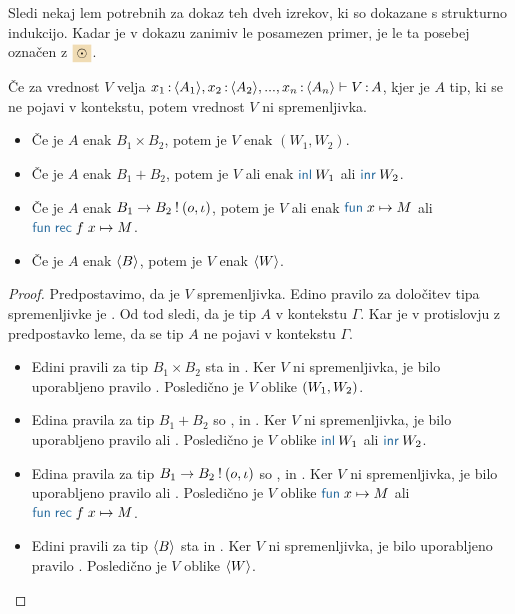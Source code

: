 Sledi nekaj lem potrebnih za dokaz teh dveh izrekov, ki so dokazane s strukturno indukcijo. Kadar je v dokazu zanimiv le posamezen primer, je le ta posebej označen z $\sitem$.


\begin{lema}\label{lem:ni-spremenljivka}
	Če za vrednost $V$ velja $x_1 \mathinner{:} \langle A_1 \rangle, x_2 \mathinner{:} \langle A_2 \rangle, ..., x_n \mathinner{:} \langle A_n \rangle \vdash V \mathinner{:} A$, kjer je $A$ tip, ki se ne pojavi v kontekstu, potem vrednost $V$ ni spremenljivka.
	\begin{itemize}
		\item Če je $A$ enak $B_1 \times B_2$, potem je $V$ enak $(W_1,W_2)$.
		\item Če je $A$ enak $B_1 + B_2$, potem je $V$ ali enak $\tminl{W_1}$ ali $\tminr{W_2}$.
		\item Če je $A$ enak $B_1 \to B_2 \mathbin{!} (o, \iota)$, potem je $V$ ali enak $\tmfunano{x}{M}$ ali $\tmfunrecano{f}{x}{M}$.
		\item Če je $A$ enak $\langle B \rangle$, potem je $V$ enak $\langle W \rangle$.
	\end{itemize}
\end{lema}

\begin{proof}
	Predpostavimo, da je $V$ spremenljivka. Edino pravilo za določitev tipa spremenljivke je .
	Od tod sledi, da je tip $A$ v kontekstu $\Gamma$. Kar je v protislovju z predpostavko leme, da se tip $A$ ne pojavi v kontekstu $\Gamma$.
	\begin{itemize}
		\item Edini pravili za tip $B_1 \times B_2$ sta  in .
		Ker $V$ ni spremenljivka, je bilo uporabljeno pravilo .
		Posledično je $V$ oblike $( W_1 , W_2 )$.
		
		\item Edina pravila za tip $B_1 + B_2$ so ,  in .
		Ker $V$ ni spremenljivka, je bilo uporabljeno pravilo  ali .
		Posledično je $V$ oblike $\tminl{W_1}$ ali $\tminr{W_2}$.
		
		\item Edina pravila za tip $B_1 \to B_2 \mathbin{!} (o, \iota)$ so ,  in .
		Ker $V$ ni spremenljivka, je bilo uporabljeno pravilo  ali .
		Posledično je $V$ oblike $\tmfunano{x}{M}$ ali $\tmfunrecano{f}{x}{M}$.
		
		\item Edini pravili za tip $\langle B \rangle$ sta  in .
		Ker $V$ ni spremenljivka, je bilo uporabljeno pravilo .
		Posledično je $V$ oblike $\langle W \rangle$.
	\end{itemize}
\end{proof}

